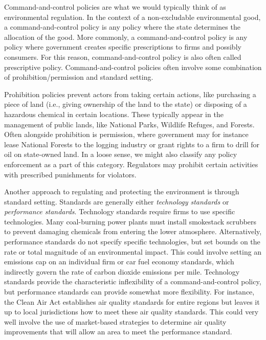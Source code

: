 Command-and-control policies are what we would typically think of as environmental regulation. In the context of a non-excludable environmental good, a command-and-control policy is any policy where the state determines the allocation of the good. More commonly, a command-and-control policy is any policy where government creates specific prescriptions to firms and possibly consumers. For this reason, command-and-control policy is also often called prescriptive policy. Command-and-control policies often involve some combination of prohibition/permission and standard setting. 

Prohibition policies prevent actors from taking certain actions, like purchasing a piece of land (i.e., giving ownership of the land to the state) or disposing of a hazardous chemical in certain locations. These typically appear in the management of public lands, like National Parks, Wildlife Refuges, and Forests. Often alongside prohibition is permission, where government may for instance lease National Forests to the logging industry or grant rights to a firm to drill for oil on state-owned land. In a loose sense, we might also classify any policy enforcement as a part of this category. Regulators may prohibit certain activities with prescribed punishments for violators. 

Another approach to regulating and protecting the environment is through standard setting. Standards are generally either \emph{technology standards} or \emph{performance standards}. Technology standards require firms to use specific technologies. Many coal-burning power plants must install smokestack scrubbers to prevent damaging chemicals from entering the lower atmosphere. Alternatively, performance standards do not specify specific technologies, but set bounds on the rate or total magnitude of an environmental impact. This could involve setting an emissions cap on an individual firm or car fuel economy standards, which indirectly govern the rate of carbon dioxide emissions per mile. Technology standards provide the characteristic inflexibility of a command-and-control policy, but performance standards can provide somewhat more flexibility. For instance, the Clean Air Act establishes air quality standards for entire regions but leaves it up to local jurisdictions how to meet these air quality standards. This could very well involve the use of market-based strategies to determine air quality improvements that will allow an area to meet the performance standard.


